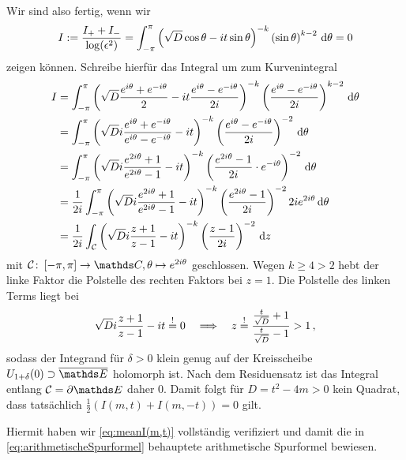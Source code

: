 \begin{bewe}
Wir sind also fertig, wenn wir
\[
	I := \frac {I_+ + I_-}{\log (\epsilon^2)} = \int_{-\pi}^\pi \left( \sqrt{D} \cos \theta - it \sin \theta \right)^{-k} \left( \sin \theta \right)^{k-2} \,\mathrm{d} \theta = 0
\]
zeigen können. Schreibe hierfür das Integral um zum Kurvenintegral
\begin{align*}
	I
	&= \int_{-\pi}^{\pi} \left( \sqrt D \frac {e^{i\theta} + e^{-i\theta}}2 - it \frac {e^{i\theta} - e^{-i\theta}}{2i} \right)^{-k} \left( \frac {e^{i\theta} - e^{-i\theta}}{2i} \right)^{k-2} \,\mathrm{d} \theta \\
	&= \int_{-\pi}^{\pi} \left( \sqrt D i \frac {e^{i\theta} + e^{-i\theta}}{e^{i\theta} - e^{-i\theta}} - it \right)^{-k} \left( \frac {e^{i\theta} - e^{-i\theta}}{2i} \right)^{-2} \,\mathrm{d} \theta \\
	&= \int_{-\pi}^{\pi} \left( \sqrt D i \frac {e^{2i\theta} + 1}{e^{2i\theta} - 1} - it \right)^{-k} \left( \frac {e^{2i\theta} - 1}{2i} \cdot e^{-i\theta} \right)^{-2} \,\mathrm{d} \theta \\
	&= \frac 1{2i} \int_{-\pi}^{\pi} \left( \sqrt D i \frac {e^{2i\theta} + 1}{e^{2i\theta} - 1} - it \right)^{-k} \left( \frac {e^{2i\theta} - 1}{2i} \right)^{-2} 2ie^{2i\theta} \,\mathrm{d} \theta \\
	&= \frac 1{2i} \int_{\mathcal C} \left( \sqrt D i \frac {z+1}{z-1} - it \right)^{-k} \left( \frac{z-1}{2i} \right)^{-2} \,\mathrm{d} z
\end{align*}
mit $\mathcal C \colon \left[ -\pi, \pi \right] \to \CC, \theta \mapsto e^{2i\theta}$ geschlossen. Wegen $k \geq 4 > 2$ hebt der linke Faktor die Polstelle des rechten Faktors bei $z = 1$. Die Polstelle des linken Terms liegt bei
\[
	\sqrt D i \frac{z+1}{z-1} - it \overset != 0 \quad \Longrightarrow \quad z \overset != \frac {\frac t{\sqrt{D}} + 1}{\frac t{\sqrt{D}} - 1} > 1
	\,,
\]
sodass der Integrand für $\delta > 0$ klein genug auf der Kreisscheibe $U_{1 + \delta}(0) \supset \closure \EE$ holomorph ist. Nach dem Residuensatz ist das Integral entlang $\mathcal C = \partial \EE$ daher $0$. Damit folgt für $D = t^2 - 4m > 0$ kein Quadrat, dass tatsächlich $\frac 12 \left( I(m,t) + I(m,-t) \right) = 0$ gilt.

Hiermit haben wir \eqref{eq:meanI(m,t)} vollständig verifiziert und damit die in \eqref{eq:arithmetischeSpurformel} behauptete arithmetische Spurformel bewiesen.

\end{bewe}
